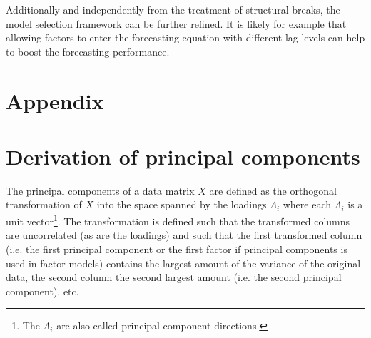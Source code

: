 \documentclass[12pt]{article}
\begin{document}
Additionally and independently from the treatment of structural breaks, the model selection framework can be further refined. It is likely for example that allowing factors to enter the forecasting equation with different lag levels can help to boost the forecasting performance.


\clearpage
\newpage
\appendix
\section*{Appendix}

\section{Derivation of principal components}
\label{Derivation of Principal Components}
The principal components of a data matrix $X$ are defined as the orthogonal transformation of $X$ into the space spanned by the loadings $\Lambda_i$ where each $\Lambda_i$ is a unit vector\footnote{The $\Lambda_i$ are also called principal component directions.}. The transformation is defined such that the transformed columns are uncorrelated (as are the loadings) and such that the first transformed column (i.e. the first principal component or the first factor if principal components is used in factor models) contains the largest amount of the variance of the original data, the second column the second largest amount (i.e. the second principal component), etc. \\
\end{document}
